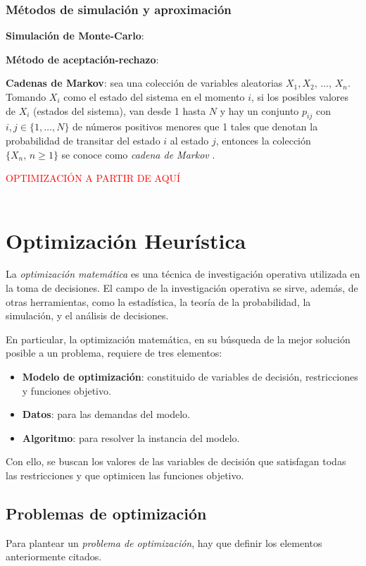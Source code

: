 \subsubsection{Métodos de simulación y aproximación}

{\bf Simulación de Monte-Carlo}:

{\bf Método de aceptación-rechazo}:


{\bf Cadenas de Markov}: sea una colección de variables aleatorias $X_1, X_2,\, \dots,\,X_n$. Tomando $X_i$ como el estado del sistema en el momento $i$, si los posibles valores de $X_i$ (estados del sistema), van desde 1 hasta $N$ y hay un conjunto $p_{ij}$ con $i, j \in \{1, \dots, N\}$ de números positivos menores que 1 tales que denotan la probabilidad de transitar del estado $i$ al estado $j$, entonces la colección $\{X_n, \,n\geq 1\}$ se conoce como \textsl{cadena de Markov} \cite{ross2022simulation}.

\newline
\textcolor{red}{OPTIMIZACIÓN A PARTIR DE AQUÍ}\\\\


\section{Optimización Heurística}
La {\sl optimización matemática} es una técnica de investigación operativa utilizada en la toma de decisiones. El campo de la investigación operativa se sirve, además, de otras herramientas, como la estadística, la teoría de la probabilidad, la simulación, y el análisis de decisiones.

En particular, la optimización matemática, en su búsqueda de la mejor solución posible a un problema, requiere de tres elementos:
\begin{itemize}
     \item {\bf Modelo de optimización}: constituido de variables de decisión, restricciones y funciones objetivo.
    \item {\bf Datos}: para las demandas del modelo.
    \item {\bf Algoritmo}: para resolver la instancia del modelo.
\end{itemize}
Con ello, se buscan los valores de las variables de decisión que satisfagan todas las restricciones y que optimicen las funciones objetivo.

\subsection{Problemas de optimización}
Para plantear un {\sl problema de optimización}, hay que definir los elementos anteriormente citados.

